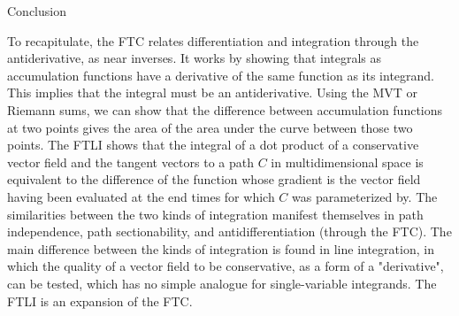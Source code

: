 \documentclass[11pt]{article}
\begin{document}

 
\pagebreak

{\centering{}Conclusion

}
To recapitulate, the FTC relates differentiation and integration through the antiderivative, as near inverses. It works by showing that integrals as accumulation functions have a derivative of the same function as its integrand. This implies that the integral must be an antiderivative. Using the MVT or Riemann sums, we can show that the difference between accumulation functions at two points gives the area of the area under the curve between those two points. The FTLI shows that the integral of a dot product of a conservative vector field and the tangent vectors to a path $C$ in multidimensional space is equivalent to the difference of the function whose gradient is the vector field having been evaluated at the end times for which $C$ was parameterized by.
The similarities between the two kinds of integration manifest themselves in path independence, path sectionability, and antidifferentiation (through the FTC). The main difference between the kinds of integration is found in line integration, in which the quality of a vector field to be conservative, as a form of a "derivative", can be tested, which has no simple analogue for single-variable integrands. The FTLI is an expansion of the FTC.
\pagebreak
\end{document}
